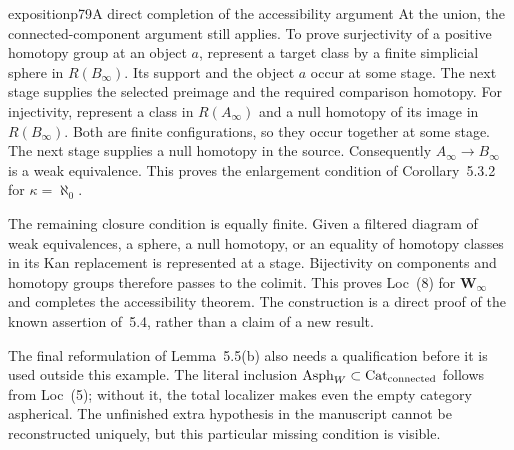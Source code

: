 \begin{dcomment}{exposition}{p79}{A direct completion of the accessibility argument}
At the union, the connected-component argument still applies. To prove surjectivity of a positive homotopy group at an object $a$, represent a target class by a finite simplicial sphere in $R(B_\infty)$. Its support and the object $a$ occur at some stage. The next stage supplies the selected preimage and the required comparison homotopy. For injectivity, represent a class in $R(A_\infty)$ and a null homotopy of its image in $R(B_\infty)$. Both are finite configurations, so they occur together at some stage. The next stage supplies a null homotopy in the source. Consequently $A_\infty\to B_\infty$ is a weak equivalence. This proves the enlargement condition of Corollary~5.3.2 for $\kappa=\aleph_0$.

The remaining closure condition is equally finite. Given a filtered diagram of weak equivalences, a sphere, a null homotopy, or an equality of homotopy classes in its Kan replacement is represented at a stage. Bijectivity on components and homotopy groups therefore passes to the colimit. This proves Loc~(8) for $\mathbf W_\infty$ and completes the accessibility theorem. The construction is a direct proof of the known assertion of~5.4, rather than a claim of a new result.

The final reformulation of Lemma~5.5(b) also needs a qualification before it is used outside this example. The literal inclusion $\operatorname{Asph}_W\subset\mathrm{Cat}_{\rm connected}$ follows from Loc~(5); without it, the total localizer makes even the empty category aspherical. The unfinished extra hypothesis in the manuscript cannot be reconstructed uniquely, but this particular missing condition is visible.
\end{dcomment}



